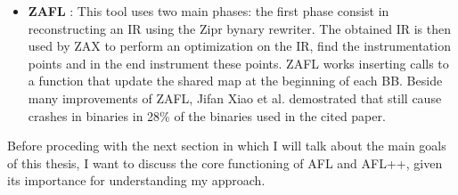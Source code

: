 \begin{itemize}
\begin{itemize}
                    \item \textbf{ZAFL} \cite{zafl} : This tool uses two main phases: the first phase consist in 
                        reconstructing an \gls{IR} using the Zipr bynary rewriter. 
                        The obtained \gls{IR} is then used by ZAX to perform an optimization on the \gls{IR}, find the instrumentation points 
                        and in the end instrument these points. ZAFL works inserting calls to a function that update the shared map 
                        at the beginning of each \gls{BB}.
                        Beside many improvements of ZAFL, Jifan Xiao et al. \cite{SystemCallPatternTracing} demostrated that 
                        still cause crashes in binaries in 28\% of the binaries used in the cited paper.
                \end{itemize}
        \end{itemize}
        Before proceding with the next section in which I will talk about the main goals of this thesis, I want to discuss the core functioning of AFL and AFL++, 
        given its importance for understanding my approach.
